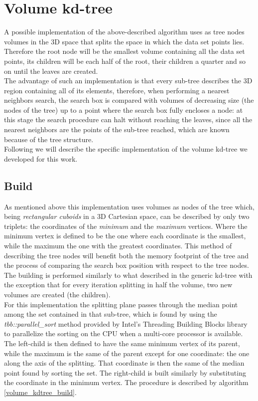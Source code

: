 \section{Volume kd-tree}
A possible implementation of the above-described algorithm uses as tree nodes volumes in the 3D space that splits the space in which the data set points lies. Therefore the root node will be the smallest volume containing all the data set points, its children will be each half of the root, their children a quarter and so on until the leaves are created.\\
The advantage of such an implementation is that every sub-tree describes the 3D region containing all of its elements, therefore, when performing a nearest neighbors search, the search box is compared with volumes of decreasing size (the nodes of the tree) up to a point where the search box fully encloses a node: at this stage the search procedure can halt without reaching the leaves, since all the nearest neighbors are the points of the sub-tree reached, which are known because of the tree structure.\\

Following we will describe the specific implementation of the volume kd-tree we developed for this work.
\subsection{Build}
As mentioned above this implementation uses volumes as nodes of the tree which, being \textit{rectangular cuboids} in a 3D Cartesian space, can be described by only two triplets: the coordinates of the \textit{minimum} and the \textit{maximum} vertices. Where the minimum vertex is defined to be the one where each coordinate is the smallest, while the maximum the one with the greatest coordinates. This method of describing the tree nodes will benefit both the memory footprint of the tree and the process of comparing the search box position with respect to the tree nodes.\\
The building is performed similarly to what described in the generic kd-tree with the exception that for every iteration splitting in half the volume, two new volumes are created (the children).\\
For this implementation the splitting plane passes through the median point among the set contained in that sub-tree, which is found by using the \textit{tbb::parallel\_sort} method provided by Intel's Threading Building Blocks library \cite{intel_tbb} to parallelize the sorting on the CPU when a multi-core processor is available.\\
The left-child is then defined to have the same minimum vertex of its parent, while the maximum is the same of the parent except for one coordinate: the one along the axis of the splitting. That coordinate is then the same of the median point found by sorting the set. The right-child is built similarly by substituting the coordinate in the minimum vertex. The procedure is described by algorithm \ref{volume_kdtree_build}.\\

